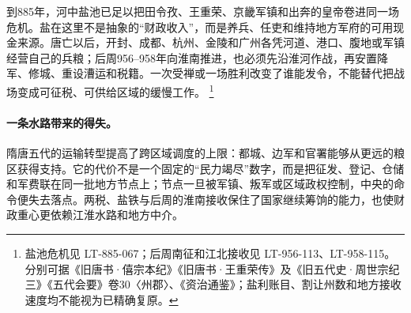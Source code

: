 到885年，河中盐池已足以把田令孜、王重荣、京畿军镇和出奔的皇帝卷进同一场危机。盐在这里不是抽象的“财政收入”，而是养兵、任吏和维持地方军府的可用现金来源。唐亡以后，开封、成都、杭州、金陵和广州各凭河道、港口、腹地或军镇经营自己的兵粮；后周956--958年向淮南推进，也必须先沿淮河作战，再安置降军、修城、重设漕运和税籍。一次受禅或一场胜利改变了谁能发令，不能替代把战场变成可征税、可供给区域的缓慢工作。%
\footnote{盐池危机见 LT-885-067；后周南征和江北接收见 LT-956-113、LT-958-115。分别可据《旧唐书·僖宗本纪》《旧唐书·王重荣传》及《旧五代史·周世宗纪三》《五代会要》卷30〈州郡〉、《资治通鉴》；盐利账目、割让州数和地方接收速度均不能视为已精确复原。}

\paragraph{一条水路带来的得失。}
隋唐五代的运输转型提高了跨区域调度的上限：都城、边军和官署能够从更远的粮区获得支持。它的代价不是一个固定的“民力竭尽”数字，而是把征发、登记、仓储和军费联在同一批地方节点上；节点一旦被军镇、叛军或区域政权控制，中央的命令便失去落点。两税、盐铁与后周的淮南接收保住了国家继续筹饷的能力，也使财政重心更依赖江淮水路和地方中介。
